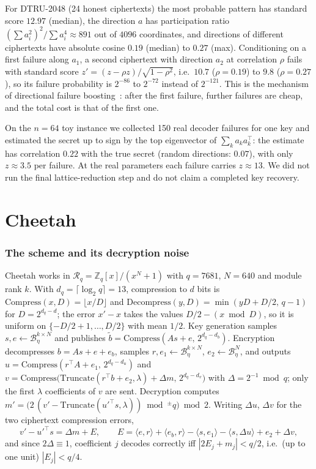 \documentclass[11pt,a4paper]{article}
\theoremstyle{definition}
\theoremstyle{remark}
\newcommand{\Z}{\mathbb{Z}}
\newcommand{\R}{\mathcal{R}}
\newcommand{\CBD}{\mathcal{B}}
\begin{document}
For DTRU-2048 (24 honest ciphertexts) the most probable pattern has standard
score $12.97$ (median), the direction $a$ has participation ratio
$(\sum a_i^2)^2/\sum a_i^4\approx 891$ out of $4096$ coordinates, and
directions of different ciphertexts have absolute cosine $0.19$ (median)
to $0.27$ (max). Conditioning on a first failure along $a_1$, a second
ciphertext with direction $a_2$ at correlation $\rho$ fails with standard
score $z'=(z-\rho z)/\sqrt{1-\rho^2}$, i.e.\ $10.7$ ($\rho=0.19$) to $9.8$
($\rho=0.27$), so its failure probability is $2^{-86}$ to $2^{-72}$
instead of $2^{-121}$. This is the mechanism of directional failure
boosting~\cite{DRV20}: after the first failure, further failures are cheap,
and the total cost is that of the first one.

On the $n=64$ toy instance we collected 150 real decoder failures for one
key and estimated the secret up to sign by the top eigenvector of
$\sum_k a_ka_k^\top$: the estimate has correlation $0.22$ with the true
secret (random directions: $0.07$), with only $z\approx3.5$ per failure.
At the real parameters each failure carries $z\approx13$. We did not run
the final lattice-reduction step and do not claim a completed key recovery.

\part{Cheetah}

\section{The scheme and its decryption noise}
\label{sec:cheetah}

Cheetah works in $\R_q=\Z_q[x]/(x^N+1)$ with $q=7681$, $N=640$ and module
rank $k$. With $d_q=\lceil\log_2 q\rceil=13$, compression to $d$ bits is
$\mathrm{Compress}(x,D)=\lfloor x/D\rfloor$ and
$\mathrm{Decompress}(y,D)=\min(yD+D/2,\,q-1)$ for $D=2^{d_q-d}$; the error
$x'-x$ takes the values $D/2-(x\bmod D)$, so it is uniform on
$\{-D/2+1,\dots,D/2\}$ with mean $1/2$. Key generation samples
$s,e\leftarrow\CBD_\eta^{k\times N}$ and publishes
$\tilde b=\mathrm{Compress}(As+e,\,2^{d_q-d_b})$. Encryption decompresses
$b=As+e+e_b$, samples $r,e_1\leftarrow\CBD_\eta^{k\times N}$,
$e_2\leftarrow\CBD_\eta^{N}$, and outputs
$u=\mathrm{Compress}(r^\top A+e_1,\,2^{d_q-d_u})$ and
$v=\mathrm{Compress}\bigl(\mathrm{Truncate}(r^\top b+e_2,\lambda)+\Delta m,\,2^{d_q-d_v}\bigr)$
with $\Delta=2^{-1}\bmod q$; only the first $\lambda$ coefficients of $v$
are sent. Decryption computes
$m'=\bigl(2\,(v'-\mathrm{Truncate}(u'^\top s,\lambda))\bmod^{\pm}q\bigr)\bmod 2$.
Writing $\Delta u$, $\Delta v$ for the two ciphertext compression errors,
\begin{equation}
\label{eq:cheetahE}
v'-u'^\top s=\Delta m+E,\qquad
E=\langle e,r\rangle+\langle e_b,r\rangle-\langle s,e_1\rangle-\langle s,\Delta u\rangle+e_2+\Delta v,
\end{equation}
and since $2\Delta\equiv1$, coefficient $j$ decodes correctly iff
$|2E_j+m_j|<q/2$, i.e.\ (up to one unit) $|E_j|<q/4$.
\end{document}
